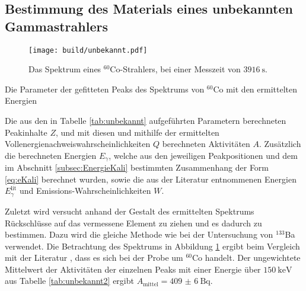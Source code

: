 \subsection{Bestimmung des Materials eines unbekannten Gammastrahlers}
\begin{figure}
	\centering
	\texttt{[image: build/unbekannt.pdf]}
	\caption{Das Spektrum eines $^{60}$Co-Strahlers, bei einer Messzeit von $\SI{3916}{\second}$.}
	\label{fig:4}
\end{figure}
\begin{table}
	\centering
	\caption{Die Parameter der gefitteten Peaks des Spektrums von $^{60}$Co mit den ermittelten Energien}
	
\end{table}
\begin{table}
	\centering
	\caption{Die aus den in Tabelle \ref{tab:unbekannt} aufgeführten Parametern berechneten Peakinhalte $Z$, und mit diesen und mithilfe der ermittelten Vollenergienachweiswahrscheinlichkeiten $Q$ berechneten Aktivitäten $A$. Zusätzlich die berechneten Energien $E_\gamma$, welche aus den jeweiligen Peakpositionen und dem im Abschnitt \ref{subsec:EnergieKali} bestimmten Zusammenhang der Form \eqref{eq:eKali} berechnet wurden, sowie die aus der Literatur entnommenen Energien $E_\gamma^\text{lit}$ und Emissions-Wahrscheinlichkeiten $W$.}
	
\end{table}
Zuletzt wird versucht anhand der Gestalt des ermittelten Spektrums Rückschlüsse auf das vermessene Element zu ziehen und es dadurch zu bestimmen. Dazu wird die gleiche Methode wie bei der Untersuchung von $^{133}$Ba verwendet. Die Betrachtung des Spektrums in Abbildung \ref{fig:4} ergibt beim Vergleich mit der Literatur \cite{BROWNE20131849}, dass es sich bei der Probe um $^{60}$Co handelt. Der ungewichtete Mittelwert der Aktivitäten der einzelnen Peaks mit einer Energie über $\SI{150}{\kilo\electronvolt}$ aus Tabelle \ref{tab:unbekannt2} ergibt $A_\text{mittel} = \SI{409(6)}{\becquerel}$.